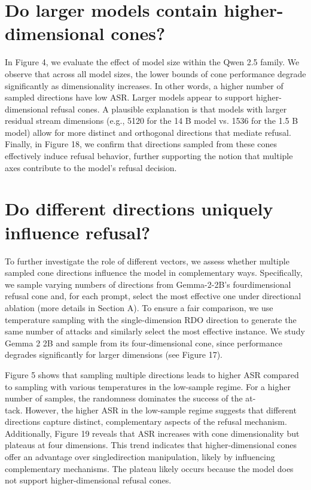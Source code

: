 \documentclass[10pt]{article}
\begin{document}
\section*{Do larger models contain higher-dimensional cones?}
In Figure 4, we evaluate the effect of model size within the Qwen 2.5 family. We observe that across all model sizes, the lower bounds of cone performance degrade significantly as dimensionality increases. In other words, a higher number of sampled directions have low ASR. Larger models appear to support higher-dimensional refusal cones. A plausible explanation is that models with larger residual stream dimensions (e.g., 5120 for the 14 B model vs. 1536 for the 1.5 B model) allow for more distinct and orthogonal directions that mediate refusal. Finally, in Figure 18, we confirm that directions sampled from these cones effectively induce refusal behavior, further supporting the notion that multiple axes contribute to the model's refusal decision.

\section*{Do different directions uniquely influence refusal?}
To further investigate the role of different vectors, we assess whether multiple sampled cone directions influence the model in complementary ways. Specifically, we sample varying numbers of directions from Gemma-2-2B's fourdimensional refusal cone and, for each prompt, select the most effective one under directional ablation (more details in Section A). To ensure a fair comparison, we use temperature sampling with the single-dimension RDO direction to generate the same number of attacks and similarly select the most effective instance. We study Gemma 2 2B and sample from its four-dimensional cone, since performance degrades significantly for larger dimensions (see Figure 17).

Figure 5 shows that sampling multiple directions leads to higher ASR compared to sampling with various temperatures in the low-sample regime. For a higher number of samples, the randomness dominates the success of the at-\\
tack. However, the higher ASR in the low-sample regime suggests that different directions capture distinct, complementary aspects of the refusal mechanism. Additionally, Figure 19 reveals that ASR increases with cone dimensionality but plateaus at four dimensions. This trend indicates that higher-dimensional cones offer an advantage over singledirection manipulation, likely by influencing complementary mechanisms. The plateau likely occurs because the model does not support higher-dimensional refusal cones.
\end{document}
